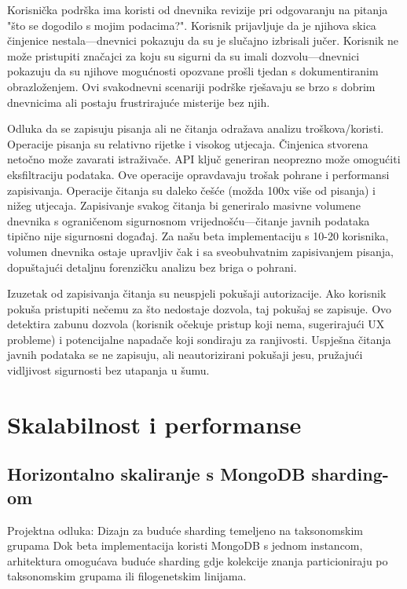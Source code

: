 \documentclass[12pt,a4paper]{article}
\begin{document}
Korisnička podrška ima koristi od dnevnika revizije pri odgovaranju na pitanja "što se dogodilo s mojim podacima?". Korisnik prijavljuje da je njihova skica činjenice nestala—dnevnici pokazuju da su je slučajno izbrisali jučer. Korisnik ne može pristupiti značajci za koju su sigurni da su imali dozvolu—dnevnici pokazuju da su njihove mogućnosti opozvane prošli tjedan s dokumentiranim obrazloženjem. Ovi svakodnevni scenariji podrške rješavaju se brzo s dobrim dnevnicima ali postaju frustrirajuće misterije bez njih.

Odluka da se zapisuju pisanja ali ne čitanja odražava analizu troškova/koristi. Operacije pisanja su relativno rijetke i visokog utjecaja. Činjenica stvorena netočno može zavarati istraživače. API ključ generiran neoprezno može omogućiti eksfiltraciju podataka. Ove operacije opravdavaju trošak pohrane i performansi zapisivanja. Operacije čitanja su daleko češće (možda 100x više od pisanja) i nižeg utjecaja. Zapisivanje svakog čitanja bi generiralo masivne volumene dnevnika s ograničenom sigurnosnom vrijednošću—čitanje javnih podataka tipično nije sigurnosni događaj. Za našu beta implementaciju s 10-20 korisnika, volumen dnevnika ostaje upravljiv čak i sa sveobuhvatnim zapisivanjem pisanja, dopuštajući detaljnu forenzičku analizu bez briga o pohrani.

Izuzetak od zapisivanja čitanja su neuspjeli pokušaji autorizacije. Ako korisnik pokuša pristupiti nečemu za što nedostaje dozvola, taj pokušaj se zapisuje. Ovo detektira zabunu dozvola (korisnik očekuje pristup koji nema, sugerirajući UX probleme) i potencijalne napadače koji sondiraju za ranjivosti. Uspješna čitanja javnih podataka se ne zapisuju, ali neautorizirani pokušaji jesu, pružajući vidljivost sigurnosti bez utapanja u šumu.

\section{Skalabilnost i performanse}

\subsection{Horizontalno skaliranje s MongoDB sharding-om}

\begin{rationale}{Projektna odluka: Dizajn za buduće sharding temeljeno na taksonomskim grupama}
Dok beta implementacija koristi MongoDB s jednom instancom, arhitektura omogućava buduće sharding gdje kolekcije znanja particioniraju po taksonomskim grupama ili filogenetskim linijama.
\end{rationale}
\end{document}
